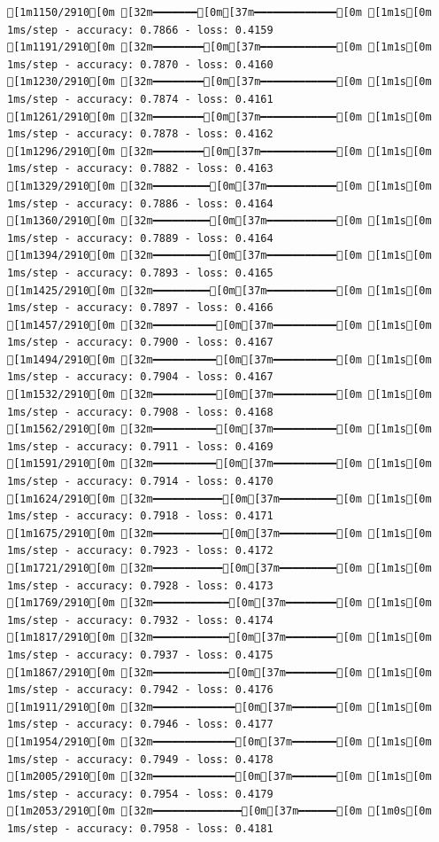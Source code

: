 \documentclass[
  letterpaper,
  DIV=11,
  numbers=noendperiod]{scrartcl}
\begin{document}
\begin{verbatim}
[1m1150/2910[0m [32m━━━━━━━[0m[37m━━━━━━━━━━━━━[0m [1m1s[0m 1ms/step - accuracy: 0.7866 - loss: 0.4159
[1m1191/2910[0m [32m━━━━━━━━[0m[37m━━━━━━━━━━━━[0m [1m1s[0m 1ms/step - accuracy: 0.7870 - loss: 0.4160
[1m1230/2910[0m [32m━━━━━━━━[0m[37m━━━━━━━━━━━━[0m [1m1s[0m 1ms/step - accuracy: 0.7874 - loss: 0.4161
[1m1261/2910[0m [32m━━━━━━━━[0m[37m━━━━━━━━━━━━[0m [1m1s[0m 1ms/step - accuracy: 0.7878 - loss: 0.4162
[1m1296/2910[0m [32m━━━━━━━━[0m[37m━━━━━━━━━━━━[0m [1m1s[0m 1ms/step - accuracy: 0.7882 - loss: 0.4163
[1m1329/2910[0m [32m━━━━━━━━━[0m[37m━━━━━━━━━━━[0m [1m1s[0m 1ms/step - accuracy: 0.7886 - loss: 0.4164
[1m1360/2910[0m [32m━━━━━━━━━[0m[37m━━━━━━━━━━━[0m [1m1s[0m 1ms/step - accuracy: 0.7889 - loss: 0.4164
[1m1394/2910[0m [32m━━━━━━━━━[0m[37m━━━━━━━━━━━[0m [1m1s[0m 1ms/step - accuracy: 0.7893 - loss: 0.4165
[1m1425/2910[0m [32m━━━━━━━━━[0m[37m━━━━━━━━━━━[0m [1m1s[0m 1ms/step - accuracy: 0.7897 - loss: 0.4166
[1m1457/2910[0m [32m━━━━━━━━━━[0m[37m━━━━━━━━━━[0m [1m1s[0m 1ms/step - accuracy: 0.7900 - loss: 0.4167
[1m1494/2910[0m [32m━━━━━━━━━━[0m[37m━━━━━━━━━━[0m [1m1s[0m 1ms/step - accuracy: 0.7904 - loss: 0.4167
[1m1532/2910[0m [32m━━━━━━━━━━[0m[37m━━━━━━━━━━[0m [1m1s[0m 1ms/step - accuracy: 0.7908 - loss: 0.4168
[1m1562/2910[0m [32m━━━━━━━━━━[0m[37m━━━━━━━━━━[0m [1m1s[0m 1ms/step - accuracy: 0.7911 - loss: 0.4169
[1m1591/2910[0m [32m━━━━━━━━━━[0m[37m━━━━━━━━━━[0m [1m1s[0m 1ms/step - accuracy: 0.7914 - loss: 0.4170
[1m1624/2910[0m [32m━━━━━━━━━━━[0m[37m━━━━━━━━━[0m [1m1s[0m 1ms/step - accuracy: 0.7918 - loss: 0.4171
[1m1675/2910[0m [32m━━━━━━━━━━━[0m[37m━━━━━━━━━[0m [1m1s[0m 1ms/step - accuracy: 0.7923 - loss: 0.4172
[1m1721/2910[0m [32m━━━━━━━━━━━[0m[37m━━━━━━━━━[0m [1m1s[0m 1ms/step - accuracy: 0.7928 - loss: 0.4173
[1m1769/2910[0m [32m━━━━━━━━━━━━[0m[37m━━━━━━━━[0m [1m1s[0m 1ms/step - accuracy: 0.7932 - loss: 0.4174
[1m1817/2910[0m [32m━━━━━━━━━━━━[0m[37m━━━━━━━━[0m [1m1s[0m 1ms/step - accuracy: 0.7937 - loss: 0.4175
[1m1867/2910[0m [32m━━━━━━━━━━━━[0m[37m━━━━━━━━[0m [1m1s[0m 1ms/step - accuracy: 0.7942 - loss: 0.4176
[1m1911/2910[0m [32m━━━━━━━━━━━━━[0m[37m━━━━━━━[0m [1m1s[0m 1ms/step - accuracy: 0.7946 - loss: 0.4177
[1m1954/2910[0m [32m━━━━━━━━━━━━━[0m[37m━━━━━━━[0m [1m1s[0m 1ms/step - accuracy: 0.7949 - loss: 0.4178
[1m2005/2910[0m [32m━━━━━━━━━━━━━[0m[37m━━━━━━━[0m [1m1s[0m 1ms/step - accuracy: 0.7954 - loss: 0.4179
[1m2053/2910[0m [32m━━━━━━━━━━━━━━[0m[37m━━━━━━[0m [1m0s[0m 1ms/step - accuracy: 0.7958 - loss: 0.4181

\end{verbatim}
\end{document}
